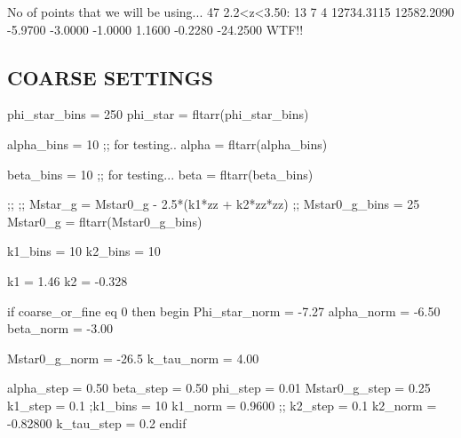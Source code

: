 No of points that we will be using...          47
   2.2<z<3.50:
      13       7       4     12734.3115     12582.2090  -5.9700  -3.0000  -1.0000   1.1600  -0.2280 -24.2500
WTF!!





\subsection{COARSE SETTINGS}
phi_star_bins = 250
phi_star = fltarr(phi_star_bins)

alpha_bins = 10     ;; for testing..
alpha = fltarr(alpha_bins)

beta_bins = 10      ;; for testing...
beta = fltarr(beta_bins)

;; 
;; Mstar_g  = Mstar0_g  - 2.5*(k1*zz + k2*zz*zz)
;;
Mstar0_g_bins = 25 
Mstar0_g  = fltarr(Mstar0_g_bins)

k1_bins = 10 
k2_bins = 10 

% 
%
k1 = 1.46
k2 = -0.328

if coarse_or_fine  eq 0 then begin
   Phi_star_norm = -7.27
   alpha_norm    = -6.50
   beta_norm     = -3.00
   
   Mstar0_g_norm = -26.5    
   k_tau_norm    = 4.00      %

   alpha_step    = 0.50     
   beta_step     = 0.50     
   phi_step      = 0.01
   Mstar0_g_step = 0.25
   k1_step       = 0.1        ;k1_bins = 10 
   k1_norm       = 0.9600    ;; 
   k2_step       = 0.1
   k2_norm       = -0.82800
   k_tau_step    = 0.2    %
endif
